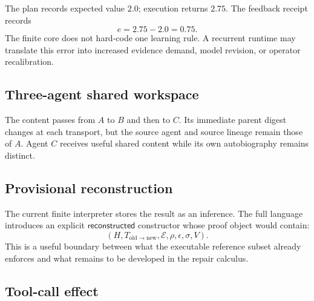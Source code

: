 

The plan records expected value \(2.0\); execution returns \(2.75\).  The
feedback receipt records
\[
e=2.75-2.0=0.75.
\]
The finite core does not hard-code one learning rule.  A recurrent runtime may
translate this error into increased evidence demand, model revision, or
operator recalibration.

\subsection{Three-agent shared workspace}



The content passes from \(A\) to \(B\) and then to \(C\).  Its immediate parent
digest changes at each transport, but the source agent and source lineage remain
those of \(A\).  Agent \(C\) receives useful shared content while its own
autobiography remains distinct.

\subsection{Provisional reconstruction}



The current finite interpreter stores the result as an inference.  The full
language introduces an explicit \(\mathsf{reconstructed}\) constructor whose
proof object would contain:
\[
(H,T_{\mathrm{old}\to\mathrm{new}},\mathcal E,\rho,\epsilon,\sigma,V).
\]
This is a useful boundary between what the executable reference subset already
enforces and what remains to be developed in the repair calculus.

\subsection{Tool-call effect}



